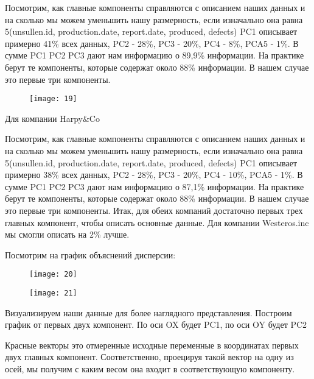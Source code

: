 \documentclass{beamer}
\begin{document}
\begin{frame}
Посмотрим, как главные компоненты справляются с описанием наших данных и на сколько мы можем уменьшить нашу размерность, если изначально она равна 5(unsullen.id, production.date, report.date, produced, defects) PC1 описывает примерно 41\% всех данных, PC2 - 28\%, PC3 - 20\%, PC4 - 8\%, PCA5 - 1\%. В сумме PC1 PC2 PC3 дают нам информацию о 89,9\% информации. На практике берут те компоненты, которые содержат около 88\% информации. В нашем случае это первые три компоненты.
\end{frame}

\begin{frame}
\begin{figure}[t]
	\centering
	\texttt{[image: 19]}
\end{figure}
Для компании Harpy\&Co
\end{frame}

\begin{frame}
Посмотрим, как главные компоненты справляются с описанием наших данных и на сколько мы можем уменьшить нашу размерность, если изначально она равна 5(unsullen.id, production.date, report.date, produced, defects) PC1 описывает примерно 38\% всех данных, PC2 - 28\%, PC3 - 20\%, PC4 - 10\%, PCA5 - 1\%. В сумме PC1 PC2 PC3 дают нам информацию о 87,1\% информации. На практике берут те компоненты, которые содержат около 88\% информации. В нашем случае это первые три компоненты.
Итак, для обеих компаний достаточно первых трех главных компонент, чтобы описать основные данные. Для компании Westeros.inc мы смогли описать на 2\% лучше.
\end{frame}

\begin{frame}
Посмотрим на график объяснений дисперсии:
\begin{figure}[t]
	\centering
	\texttt{[image: 20]}
\end{figure}
\begin{figure}[t]
	\centering
	\texttt{[image: 21]}
\end{figure}
\end{frame}

\begin{frame}

Визуализируем наши данные для более наглядного представления. Построим график от первых двух компонент. По оси OX будет PC1, по оси OY будет PC2

Красные векторы это отмеренные исходные переменные в координатах первых двух главных компонент. Соответственно, проецируя такой вектор на одну из осей, мы получим с каким весом она входит в соответствующую компоненту.
\end{frame}
\end{document}
